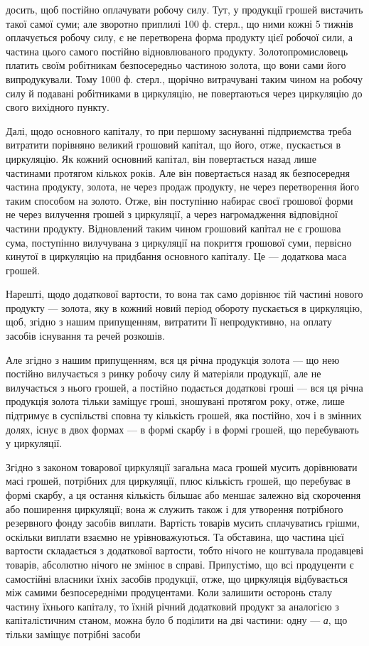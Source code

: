 \parcont{}  %
досить, щоб постійно оплачувати робочу силу. Тут, у продукції грошей
вистачить такої самої суми; але зворотно приплилі 100 ф. стерл., що ними
кожні 5 тижнів оплачується робочу силу, є не перетворена форма продукту
цієї робочої сили, а частина цього самого постійно відновлюваного
продукту. Золотопромисловець платить своїм робітникам безпосередньо
частиною золота, що вони сами його випродукували. Тому 1000 ф. стерл.,
щорічно витрачувані таким чином на робочу силу й подавані робітниками
в циркуляцію, не повертаються через циркуляцію до свого вихідного
пункту.

Далі, щодо основного капіталу, то при першому заснуванні підприємства
треба витратити порівняно великий грошовий капітал, що його,
отже, пускається в циркуляцію. Як кожний основний капітал, він повертається
назад лише частинами протягом кількох років. Але він повертається
назад як безпосередня частина продукту, золота, не через продаж
продукту, не через перетворення його таким способом на золото. Отже,
він поступінно набирає своєї грошової форми не через вилучення грошей
з циркуляції, а через нагромадження відповідної частини продукту.
Відновлений таким чином грошовий капітал не є грошова сума, поступінно
вилучувана з циркуляції на покриття грошової суми, первісно кинутої
в циркуляцію на придбання основного капіталу. Це — додаткова
маса грошей.

Нарешті, щодо додаткової вартости, то вона так само дорівнює тій
частині нового продукту — золота, яку в кожний новий період обороту
пускається в циркуляцію, щоб, згідно з нашим припущенням, витратити
Її непродуктивно, на оплату засобів існування та речей розкошів.

Але згідно з нашим припущенням, вся ця річна продукція золота —
що нею постійно вилучається з ринку робочу силу й матеріяли продукції,
але не вилучається з нього грошей, а постійно подається додаткові гроші
— вся ця річна продукція золота тільки заміщує гроші, зношувані протягом
року, отже, лише підтримує в суспільстві сповна ту кількість грошей,
яка постійно, хоч і в змінних долях, існує в двох формах — в формі
скарбу і в формі грошей, що перебувають у циркуляції.

Згідно з законом товарової циркуляції загальна маса грошей мусить
дорівнювати масі грошей, потрібних для циркуляції, плюс кількість грошей,
що перебуває в формі скарбу, а ця остання кількість більшає або
меншає залежно від скорочення або поширення циркуляції; вона ж служить
також і для утворення потрібного резервного фонду засобів виплати.
Вартість товарів мусить сплачуватись грішми, оскільки виплати
взаємно не урівноважуються. Та обставина, що частина цієї вартости
складається з додаткової вартости, тобто нічого не коштувала продавцеві
товарів, абсолютно нічого не змінює в справі. Припустімо, що всі
продуценти є самостійні власники їхніх засобів продукції, отже, що циркуляція
відбувається між самими безпосередніми продуцентами. Коли залишити
осторонь сталу частину їхнього капіталу, то їхній річний додатковий
продукт за аналогією з капіталістичним станом, можна було б поділити
на дві частини: одну — \emph{а}, що тільки заміщує потрібні засоби
\parbreak{}  %
